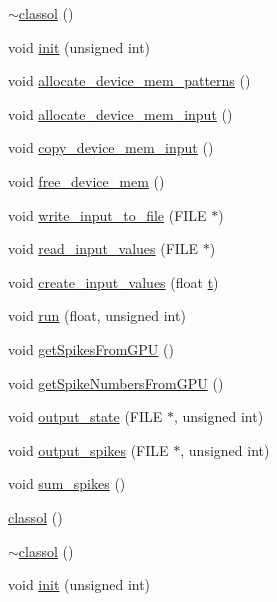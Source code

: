 \begin{DoxyCompactItemize}
\hyperlink{classclassol_a1273a6a57e2127a7b028bdbd92fed9b4}{$\sim$classol} ()
\item 
void \hyperlink{classclassol_ae1d319555e41d814ef2f8407418df8dc}{init} (unsigned int)
\item 
void \hyperlink{classclassol_a224bf755bd74d7512606518ae2658215}{allocate\+\_\+device\+\_\+mem\+\_\+patterns} ()
\item 
void \hyperlink{classclassol_aec30118b75a92ebca10eb227345cddfe}{allocate\+\_\+device\+\_\+mem\+\_\+input} ()
\item 
void \hyperlink{classclassol_aa831eea394ef445a1268f1928b737f27}{copy\+\_\+device\+\_\+mem\+\_\+input} ()
\item 
void \hyperlink{classclassol_ade653847f5de20fe2f944260d532ddf9}{free\+\_\+device\+\_\+mem} ()
\item 
void \hyperlink{classclassol_a838ec68a127f675e9d993fccd8aacd3f}{write\+\_\+input\+\_\+to\+\_\+file} (F\+I\+L\+E $\ast$)
\item 
void \hyperlink{classclassol_a79b3bb160419ce4f1ebb17327f9e77ca}{read\+\_\+input\+\_\+values} (F\+I\+L\+E $\ast$)
\item 
void \hyperlink{classclassol_ad02f7613b7db219eaf0edf7429f65475}{create\+\_\+input\+\_\+values} (float \hyperlink{PoissonIzh__sim_8h_afea36502e9d227ff62c5fb2719a246f2}{t})
\item 
void \hyperlink{classclassol_ae907498a8660fe41f7d9b41aad6e5d10}{run} (float, unsigned int)
\item 
void \hyperlink{classclassol_ae571e028c069103e19bb4975bdb0dd47}{get\+Spikes\+From\+G\+P\+U} ()
\item 
void \hyperlink{classclassol_a08d82fc16288158062aef866a1e29a65}{get\+Spike\+Numbers\+From\+G\+P\+U} ()
\item 
void \hyperlink{classclassol_a88179d17f4ea568b7b58a329a741eb53}{output\+\_\+state} (F\+I\+L\+E $\ast$, unsigned int)
\item 
void \hyperlink{classclassol_a54d61e7df53d16d7b8e1de46bcca6c6c}{output\+\_\+spikes} (F\+I\+L\+E $\ast$, unsigned int)
\item 
void \hyperlink{classclassol_af9dfaa92f0e4737dbadd9ec9cd203555}{sum\+\_\+spikes} ()
\item 
\hyperlink{classclassol_a0f4a2bbdd48bcdfcc2abaa58a839232c}{classol} ()
\item 
\hyperlink{classclassol_a1273a6a57e2127a7b028bdbd92fed9b4}{$\sim$classol} ()
\item 
void \hyperlink{classclassol_ae1d319555e41d814ef2f8407418df8dc}{init} (unsigned int)

\end{DoxyCompactItemize}
